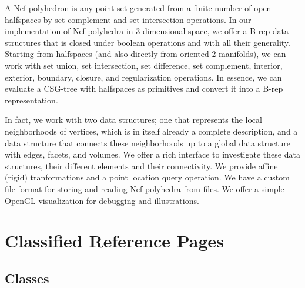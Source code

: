 



A Nef polyhedron is any point set generated from a finite number of
open halfspaces by set complement and set intersection operations.  In
our implementation of Nef polyhedra in 3-dimensional space, we offer a
B-rep data structures that is closed under boolean operations and with
all their generality. Starting from halfspaces (and also directly from
oriented 2-manifolds), we can work with set union, set intersection,
set difference, set complement, interior, exterior, boundary, closure,
and regularization operations. In essence, we can evaluate a CSG-tree
with halfspaces as primitives and convert it into a B-rep
representation.

In fact, we work with two data structures; one that represents the
local neighborhoods of vertices, which is in itself already a complete
description, and a data structure that connects these neighborhoods up
to a global data structure with edges, facets, and volumes. We offer a
rich interface to investigate these data structures, their different
elements and their connectivity. We provide affine (rigid)
tranformations and a point location query operation. We have a custom
file format for storing and reading Nef polyhedra from files. We offer
a simple OpenGL visualization for debugging and illustrations.

\section{Classified Reference Pages}

\subsection*{Classes}

